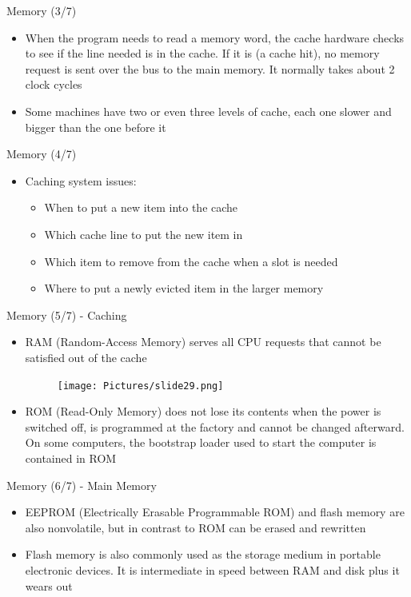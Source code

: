\documentclass{beamer}
\begin{document}
\begin{frame}
{\centerline{Memory (3/7)}}
\begin{itemize}
    \item When the program needs to read a memory word, the cache hardware checks to see if the line needed is in the cache. If it is (a cache hit), no memory request is sent over the bus to the main memory. It normally takes about 2 clock cycles 
    \item Some machines have two or even three levels of cache, each one slower and bigger than the one before it
\end{itemize}
\end{frame}


\begin{frame}
{\centerline{Memory (4/7)}}
\begin{itemize}
    \item Caching system issues:
    \begin{itemize}
        \item When to put a new item into the cache
        \item Which cache line to put the new item in 
        \item Which item to remove from the cache when a slot is needed
        \item Where to put a newly evicted item in the larger memory
    \end{itemize}
\end{itemize}
\end{frame}


\begin{frame}
{\centerline{Memory (5/7) - Caching}}
\begin{itemize}
    \item RAM (Random-Access Memory) serves all CPU requests that cannot be satisfied out of the cache
    \begin{figure}
        \centering
        \texttt{[image: Pictures/slide29.png]}
    \end{figure}
    \item ROM (Read-Only Memory) does not lose its contents
when the power is switched off, is programmed at the factory and cannot be changed afterward. On some computers, the bootstrap loader used to start the computer is contained in ROM
\end{itemize}
\end{frame}


\begin{frame}
{\centerline{Memory (6/7) - Main Memory}}
\begin{itemize}
    \item EEPROM (Electrically Erasable Programmable ROM) and flash memory are also nonvolatile, but in contrast to ROM can be erased and rewritten  
    \item Flash memory is also commonly used as the storage medium in portable electronic devices. It is intermediate in speed between RAM and disk plus it wears out
\end{itemize}
\end{frame}
\end{document}
